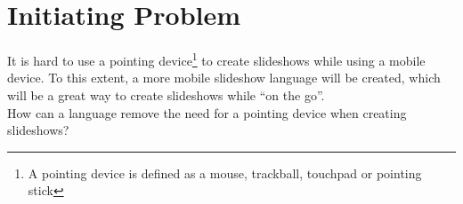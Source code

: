 \section{Initiating Problem}
It is hard to use a pointing device\footnote{A pointing device is defined as a mouse, trackball, touchpad or pointing stick} to create slideshows while using a mobile device. To this extent, a more mobile slideshow language will be created, which will be a great way to create slideshows while ``on the go''. \\
How can a language remove the need for a pointing device when creating slideshows?